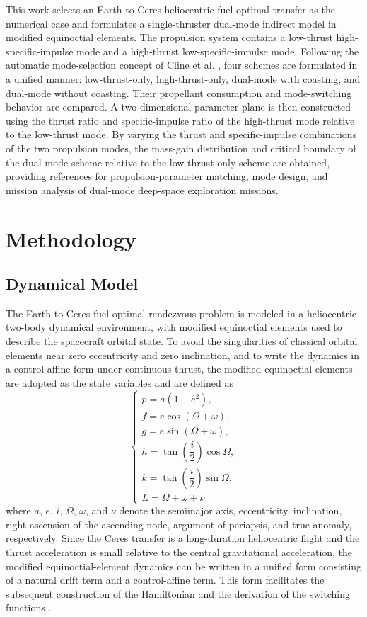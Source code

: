\documentclass{IEEEtaes}
\begin{document}
This work selects an Earth-to-Ceres heliocentric fuel-optimal transfer as the numerical case and formulates a single-thruster dual-mode indirect model in modified equinoctial elements. The propulsion system contains a low-thrust high-specific-impulse mode and a high-thrust low-specific-impulse mode. Following the automatic mode-selection concept of Cline et al. \cite{cline2024a}, four schemes are formulated in a unified manner: low-thrust-only, high-thrust-only, dual-mode with coasting, and dual-mode without coasting. Their propellant consumption and mode-switching behavior are compared. A two-dimensional parameter plane is then constructed using the thrust ratio and specific-impulse ratio of the high-thrust mode relative to the low-thrust mode. By varying the thrust and specific-impulse combinations of the two propulsion modes, the mass-gain distribution and critical boundary of the dual-mode scheme relative to the low-thrust-only scheme are obtained, providing references for propulsion-parameter matching, mode design, and mission analysis of dual-mode deep-space exploration missions.


\section{Methodology}

\subsection{Dynamical Model}
The Earth-to-Ceres fuel-optimal rendezvous problem is modeled in a heliocentric two-body dynamical environment, with modified equinoctial elements used to describe the spacecraft orbital state. To avoid the singularities of classical orbital elements near zero eccentricity and zero inclination, and to write the dynamics in a control-affine form under continuous thrust, the modified equinoctial elements are adopted as the state variables and are defined as
\begin{equation}
\begin{cases}
p=a(1-e^2),\\
f=e\cos(\Omega+\omega),\\
g=e\sin(\Omega+\omega),\\
h=\tan\left(\dfrac{i}{2}\right)\cos\Omega,\\
k=\tan\left(\dfrac{i}{2}\right)\sin\Omega,\\
L=\Omega+\omega+\nu
\end{cases}
\end{equation}
where $a$, $e$, $i$, $\Omega$, $\omega$, and $\nu$ denote the semimajor axis, eccentricity, inclination, right ascension of the ascending node, argument of periapsis, and true anomaly, respectively. Since the Ceres transfer is a long-duration heliocentric flight and the thrust acceleration is small relative to the central gravitational acceleration, the modified equinoctial-element dynamics can be written in a unified form consisting of a natural drift term and a control-affine term. This form facilitates the subsequent construction of the Hamiltonian and the derivation of the switching functions \cite{jiang2012,chi2022}.
\end{document}
